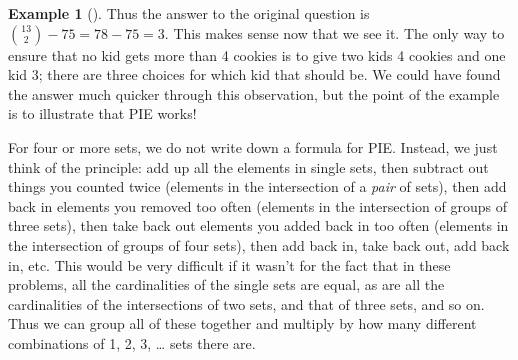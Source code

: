 \documentclass[10pt,]{book}
\theoremstyle{plain}
\theoremstyle{definition}
\newtheorem{example}[theorem]{Example}
\theoremstyle{definition}
\theoremstyle{definition}
\numberwithin{equation}{section}
\begin{document}
\begin{example}[]
          Thus the answer to the original question is \({13 \choose 2} - 75 = 78 - 75 = 3\). This makes sense now that we see it. The only way to ensure that no kid gets more than 4 cookies is to give two kids 4 cookies and one kid 3; there are three choices for which kid that should be. We could have found the answer much quicker through this observation, but the point of the example is to illustrate that PIE works!
\end{example}
\par

      For four or more sets, we do not write down a formula for PIE. Instead, we just think of the principle: add up all the elements in single sets, then subtract out things you counted twice (elements in the intersection of a \emph{pair} of sets), then add back in elements you removed too often (elements in the intersection of groups of three sets), then take back out elements you added back in too often (elements in the intersection of groups of four sets), then add back in, take back out, add back in, etc. This would be very difficult if it wasn't for the fact that in these problems, all the cardinalities of the single sets are equal, as are all the cardinalities of the intersections of two sets, and that of three sets, and so on. Thus we can group all of these together and multiply by how many different combinations of 1, 2, 3,
      \dots{} sets there are.
\end{document}
